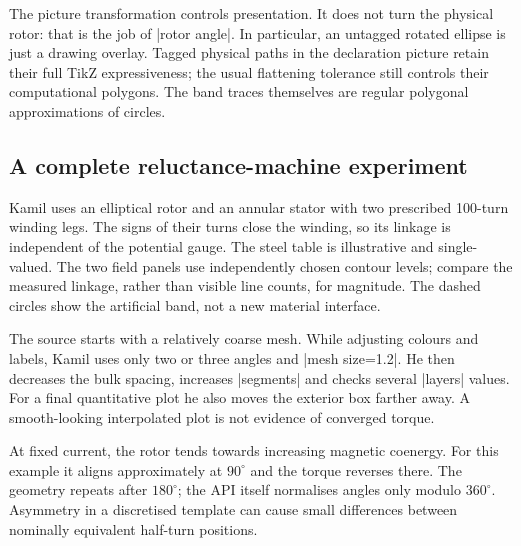 \begin{codeexample}
\end{codeexample}
The picture transformation controls presentation. It does not turn the physical
rotor: that is the job of |rotor angle|. In particular, an untagged rotated
ellipse is just a drawing overlay. Tagged physical paths in the declaration
picture retain their full TikZ expressiveness; the usual flattening tolerance
still controls their computational polygons. The band traces themselves are
regular polygonal approximations of circles.

\subsection{A complete reluctance-machine experiment}
Kamil uses an elliptical rotor and an annular stator with two prescribed
100-turn winding legs. The signs of their turns close the winding, so its
linkage is independent of the potential gauge. The steel table is illustrative
and single-valued. The two field panels use independently chosen contour levels;
compare the measured linkage, rather than visible line counts, for magnitude.
The dashed circles show the artificial band, not a new material interface.

The source starts with a relatively coarse mesh. While adjusting colours and
labels, Kamil uses only two or three angles and |mesh size=1.2|. He then decreases
the bulk spacing, increases |segments| and checks several |layers| values.
For a final quantitative plot he also moves the exterior box farther away.
A smooth-looking interpolated plot is not evidence of converged torque.


At fixed current, the rotor tends towards increasing magnetic coenergy. For
this example it aligns approximately at $90^\circ$ and the torque reverses
there. The geometry repeats after $180^\circ$; the API itself normalises angles
only modulo $360^\circ$. Asymmetry in a discretised template can cause small
differences between nominally equivalent half-turn positions.

